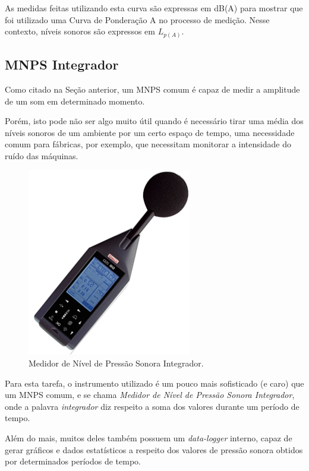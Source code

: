 \documentclass[
    12pt,               %
    openright,          %
    oneside,
    a4paper,            
    english,            %
    brazil              %
    ]{abntex2}
\begin{document}
As medidas feitas utilizando esta curva são expressas em dB(A) para mostrar que foi utilizado uma Curva de Ponderação A no processo de medição. Nesse contexto, níveis sonoros são expressos em $L_{p(A)}$.

\subsection{MNPS Integrador}

Como citado na Seção anterior, um MNPS comum é capaz de medir a amplitude de um som em determinado momento. 

Porém, isto pode não ser algo muito útil quando é necessário tirar uma média dos níveis sonoros de um ambiente por um certo espaço de tempo, uma necessidade comum para fábricas, por exemplo, que necessitam monitorar a intensidade do ruído das máquinas.

\begin{figure}[!htb]
  \caption{\label{integ}Medidor de Nível de Pressão Sonora Integrador.}
  \begin{center}
    \includegraphics[scale=0.34]{images/integrador.jpg}
  \end{center}
\end{figure}

Para esta tarefa, o instrumento utilizado é um pouco mais sofisticado (e caro) que um MNPS comum, e se chama \textit{Medidor de Nível de Pressão Sonora Integrador}, onde a palavra \textit{integrador} diz respeito a soma dos valores durante um período de tempo. 

Além do mais, muitos deles também possuem um \textit{data-logger} interno, capaz de gerar gráficos e dados estatísticos a respeito dos valores de pressão sonora obtidos por determinados períodos de tempo.
\end{document}
